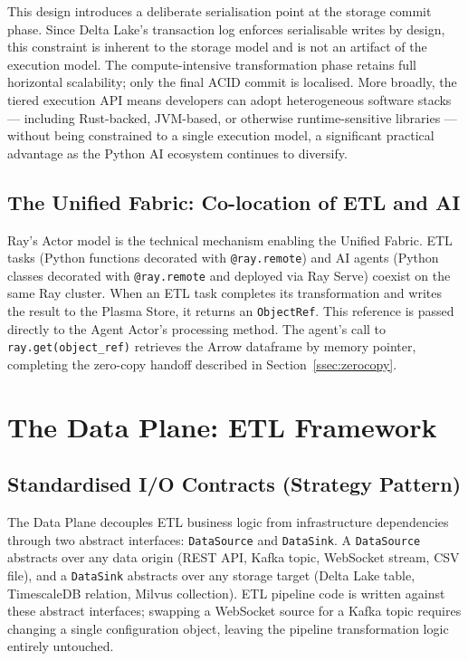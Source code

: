 \documentclass[12pt, a4paper]{report}
\begin{document}
This design introduces a deliberate serialisation point at the storage commit phase.
Since Delta Lake's transaction log enforces serialisable writes by design, this
constraint is inherent to the storage model and is not an artifact of the execution
model.
The compute-intensive transformation phase retains full horizontal scalability; only
the final ACID commit is localised.
More broadly, the tiered execution API means developers can adopt heterogeneous
software stacks — including Rust-backed, JVM-based, or otherwise runtime-sensitive
libraries — without being constrained to a single execution model, a significant
practical advantage as the Python AI ecosystem continues to diversify.
\subsection{The Unified Fabric: Co-location of ETL and AI}
\label{ssec:unified_fabric_impl}

Ray's Actor model is the technical mechanism enabling the Unified Fabric.
ETL tasks (Python functions decorated with \texttt{@ray.remote}) and AI agents
(Python classes decorated with \texttt{@ray.remote} and deployed via Ray Serve)
coexist on the same Ray cluster.
When an ETL task completes its transformation and writes the result to the Plasma Store,
it returns an \texttt{ObjectRef}.
This reference is passed directly to the Agent Actor's processing method.
The agent's call to \texttt{ray.get(object\_ref)} retrieves the Arrow dataframe by
memory pointer, completing the zero-copy handoff described in
Section~\ref{ssec:zerocopy}.

\section{The Data Plane: ETL Framework}
\label{sec:data_plane}

\subsection{Standardised I/O Contracts (Strategy Pattern)}
\label{ssec:io_contracts}

The Data Plane decouples ETL business logic from infrastructure dependencies through two
abstract interfaces: \texttt{DataSource} and \texttt{DataSink}.
A \texttt{DataSource} abstracts over any data origin (REST API, Kafka topic, WebSocket
stream, CSV file), and a \texttt{DataSink} abstracts over any storage target
(Delta Lake table, TimescaleDB relation, Milvus collection).
ETL pipeline code is written against these abstract interfaces; swapping a WebSocket
source for a Kafka topic requires changing a single configuration object, leaving the
pipeline transformation logic entirely untouched.
\end{document}
